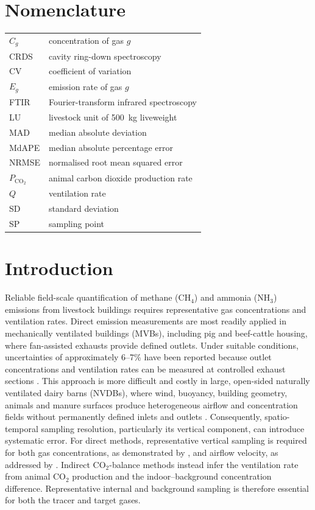 \documentclass[12pt,a4paper]{article}
\begin{document}
\section*{Nomenclature}
\begin{tabular}{@{}ll@{}}
\(C_g\) & concentration of gas \(g\)\\
CRDS & cavity ring-down spectroscopy\\
CV & coefficient of variation\\
\(E_g\) & emission rate of gas \(g\)\\
FTIR & Fourier-transform infrared spectroscopy\\
LU & livestock unit of \SI{500}{kg} liveweight\\
MAD & median absolute deviation\\
MdAPE & median absolute percentage error\\
NRMSE & normalised root mean squared error\\
\(P_{\mathrm{CO_2}}\) & animal carbon dioxide production rate\\
\(Q\) & ventilation rate\\
SD & standard deviation\\
SP & sampling point\\
\end{tabular}

\section{Introduction}

Reliable field-scale quantification of methane (\(\mathrm{CH_4}\)) and ammonia (\(\mathrm{NH_3}\)) emissions from livestock buildings requires representative gas concentrations and ventilation rates. Direct emission measurements are most readily applied in mechanically ventilated buildings (MVBs), including pig and beef-cattle housing, where fan-assisted exhausts provide defined outlets. Under suitable conditions, uncertainties of approximately 6--7\% have been reported because outlet concentrations and ventilation rates can be measured at controlled exhaust sections \citep{Calvet2013}. This approach is more difficult and costly in large, open-sided naturally ventilated dairy barns (NVDBs), where wind, buoyancy, building geometry, animals and manure surfaces produce heterogeneous airflow and concentration fields without permanently defined inlets and outlets \citep{Ogink2013,Saha2013}. Consequently, spatio-temporal sampling resolution, particularly its vertical component, can introduce systematic error. For direct methods, representative vertical sampling is required for both gas concentrations, as demonstrated by \citet{Sahu2023}, and airflow velocity, as addressed by \citet{Coorevits2025Direct}. Indirect \(\mathrm{CO_2}\)-balance methods instead infer the ventilation rate from animal \(\mathrm{CO_2}\) production and the indoor--background concentration difference. Representative internal and background sampling is therefore essential for both the tracer and target gases.
\end{document}
